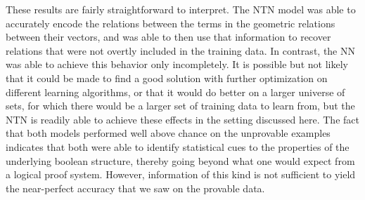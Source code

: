\documentclass[letterpaper]{article}
\begin{document}




These results are fairly straightforward to interpret. The NTN model
was able to accurately encode the relations between the terms in the
geometric relations between their vectors, and was able to then use
that information to recover relations that were not overtly included
in the training data. In contrast, the NN was able to achieve this
behavior only incompletely. It is possible but not likely that it
could be made to find a good solution with further optimization on
different learning algorithms, or that it would do better on a larger
universe of sets, for which there would be a larger set of training
data to learn from, but the NTN is readily able to achieve these
effects in the setting discussed here. The fact that both models performed
well above chance on the unprovable examples indicates that both were able
to identify statistical cues to the properties of the underlying boolean structure,
thereby going beyond what one would expect from a logical proof system. However, 
information of this kind is not sufficient to yield the near-perfect
accuracy that we saw on the provable data.
\end{document}
